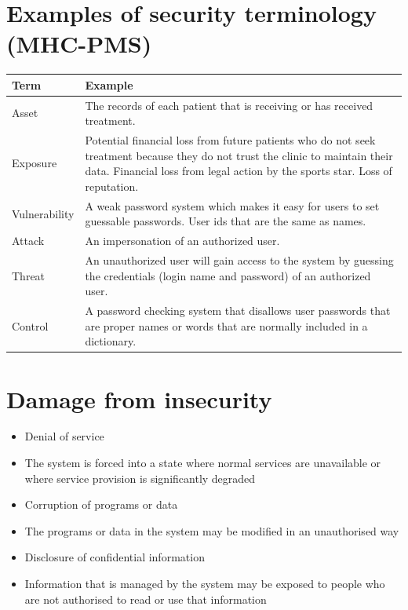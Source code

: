 \section{Examples of security terminology (MHC-PMS)}
\begin{table}[h!]
\centering
\begin{tabular}{ |p{3cm}|p{8cm}|  }
\hline
Term & Example \\
\hline
\hline
Asset & The records of each patient that is receiving or has received treatment.\\
\hline
Exposure & Potential financial loss from future patients who do not seek treatment because they do not trust the clinic to maintain their data. Financial loss from legal action by the sports star. Loss of reputation.\\
\hline
Vulnerability & A weak password system which makes it easy for users to set guessable passwords. User ids that are the same as names.\\
\hline
Attack & An impersonation of an authorized user.\\
\hline
Threat & An unauthorized user will gain access to the system by guessing the credentials (login name and password) of an authorized user.\\
\hline
Control & A password checking system that disallows user passwords that are proper names or words that are normally included in a dictionary.\\
\hline
\end{tabular}

\label{table:T4_2}
\end{table}

\section{Damage from insecurity}
\begin{itemize}
\item Denial of service

  \item The system is forced into a state where normal services are unavailable or where service provision is significantly degraded

\item Corruption of programs or data

  \item The programs or data in the system may be modified in an unauthorised way

\item Disclosure of confidential information

  \item Information that is managed by the system may be exposed to people who are not authorised to read or use that information


\end{itemize}
